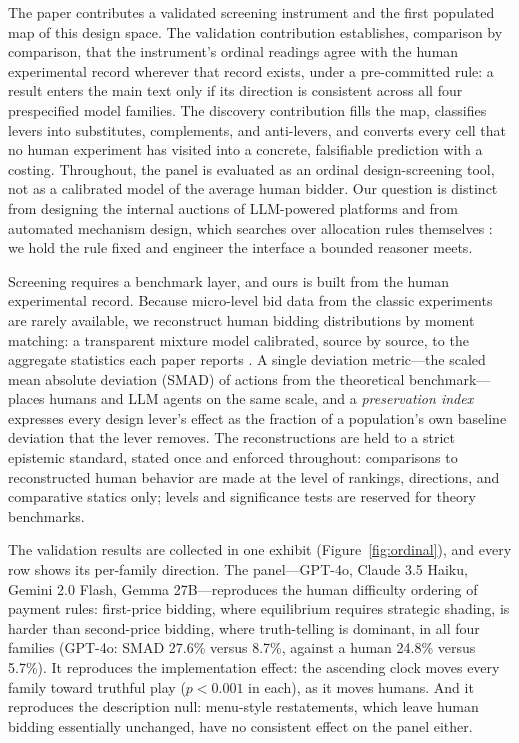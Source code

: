 The paper contributes a validated screening instrument and the first populated map of this design space. The validation contribution establishes, comparison by comparison, that the instrument's ordinal readings agree with the human experimental record wherever that record exists, under a pre-committed rule: a result enters the main text only if its direction is consistent across all four prespecified model families. The discovery contribution fills the map, classifies levers into substitutes, complements, and anti-levers, and converts every cell that no human experiment has visited into a concrete, falsifiable prediction with a costing. Throughout, the panel is evaluated as an ordinal design-screening tool, not as a calibrated model of the average human bidder. Our question is distinct from designing the internal auctions of LLM-powered platforms \citep{duetting2024mechanism} and from automated mechanism design, which searches over allocation rules themselves \citep{dutting2024optimal, wang2024gemnet}: we hold the rule fixed and engineer the interface a bounded reasoner meets.

Screening requires a benchmark layer, and ours is built from the human experimental record. Because micro-level bid data from the classic experiments are rarely available, we reconstruct human bidding distributions by moment matching: a transparent mixture model calibrated, source by source, to the aggregate statistics each paper reports \citep{kagel1993independent, li2017obviously, breitmoser2022obviousness, gonczarowski2023strategyproofness}. A single deviation metric---the scaled mean absolute deviation (SMAD) of actions from the theoretical benchmark---places humans and LLM agents on the same scale, and a \emph{preservation index} expresses every design lever's effect as the fraction of a population's own baseline deviation that the lever removes. The reconstructions are held to a strict epistemic standard, stated once and enforced throughout: comparisons to reconstructed human behavior are made at the level of rankings, directions, and comparative statics only; levels and significance tests are reserved for theory benchmarks.

The validation results are collected in one exhibit (Figure~\ref{fig:ordinal}), and every row shows its per-family direction. The panel---GPT-4o, Claude 3.5 Haiku, Gemini 2.0 Flash, Gemma 27B---reproduces the human difficulty ordering of payment rules: first-price bidding, where equilibrium requires strategic shading, is harder than second-price bidding, where truth-telling is dominant, in all four families (GPT-4o: SMAD 27.6\% versus 8.7\%, against a human 24.8\% versus 5.7\%). It reproduces the implementation effect: the ascending clock moves every family toward truthful play ($p<0.001$ in each), as it moves humans. And it reproduces the description null: menu-style restatements, which leave human bidding essentially unchanged, have no consistent effect on the panel either.


